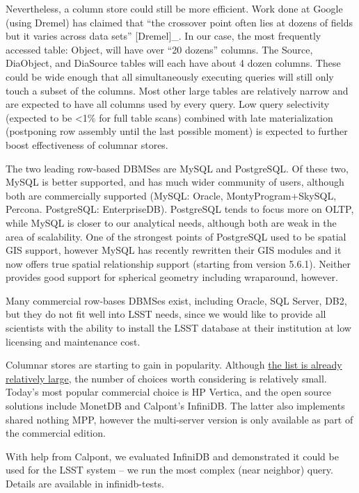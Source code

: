 \documentclass[DM,lsstdraft,toc]{lsstdoc}
\begin{document}
Nevertheless, a column store could still be more efficient. Work done at
Google (using Dremel) has claimed that ``the crossover point often lies
at dozens of fields but it varies across data sets'' {[}Dremel{]}\_. In
our case, the most frequently accessed table: Object, will have over
``20 dozens'' columns. The Source, DiaObject, and DiaSource tables will
each have about 4 dozen columns. These could be wide enough that all
simultaneously executing queries will still only touch a subset of the
columns. Most other large tables are relatively narrow and are expected
to have all columns used by every query. Low query selectivity (expected
to be \textless{}1\% for full table scans) combined with late
materialization (postponing row assembly until the last possible moment)
is expected to further boost effectiveness of columnar stores.

The two leading row-based DBMSes are MySQL and PostgreSQL. Of these two,
MySQL is better supported, and has much wider community of users,
although both are commercially supported (MySQL: Oracle,
MontyProgram+SkySQL, Percona. PostgreSQL: EnterpriseDB). PostgreSQL
tends to focus more on OLTP, while MySQL is closer to our analytical
needs, although both are weak in the area of scalability. One of the
strongest points of PostgreSQL used to be spatial GIS support, however
MySQL has recently rewritten their GIS modules and it now offers true
spatial relationship support (starting from version 5.6.1). Neither
provides good support for spherical geometry including wraparound,
however.

Many commercial row-bases DBMSes exist, including Oracle, SQL Server,
DB2, but they do not fit well into LSST needs, since we would like to
provide all scientists with the ability to install the LSST database at
their institution at low licensing and maintenance cost.

Columnar stores are starting to gain in popularity. Although
\href{http://en.wikipedia.org/wiki/Column-oriented_DBMS}{the list is
already relatively large}, the number of choices worth considering is
relatively small. Today's most popular commercial choice is HP Vertica,
and the open source solutions include MonetDB and Calpont's InfiniDB.
The latter also implements shared nothing MPP, however the multi-server
version is only available as part of the commercial edition.

With help from Calpont, we evaluated InfiniDB and demonstrated it could
be used for the LSST system -- we run the most complex (near neighbor)
query. Details are available in infinidb-tests.
\end{document}
